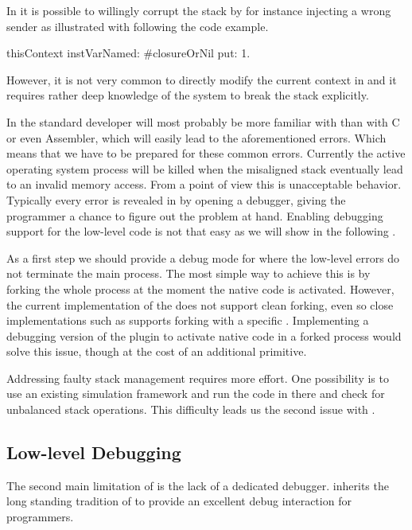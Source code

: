 \noindent In \PH it is possible to willingly corrupt the stack by for instance injecting a wrong sender as illustrated with following the code example.
%
\begin{stcode}[label=lst:benzo-pharo-stack-corruption]{}
thisContext instVarNamed: #closureOrNil put: 1.
\end{stcode}
%
However, it is not very common to directly modify the current context in \PH and it requires rather deep knowledge of the system to break the stack explicitly.

In \B the standard developer will most probably be more familiar with \PH than with C or even Assembler, which will easily lead to the aforementioned errors.
Which means that we have to be prepared for these common errors.
Currently the active operating system process will be killed when the misaligned stack eventually lead to an invalid memory access.
From a \PH point of view this is unacceptable behavior.
Typically every error is revealed in \PH by opening a debugger, giving the programmer a chance to figure out the problem at hand.
Enabling debugging support for the low-level \B code is not that easy as we will show in the following .

As a first step we should provide a debug mode for \B where the low-level errors do not terminate the main process.
The most simple way to achieve this is by forking the whole \VM process at the moment the native \B code is activated.
However, the current implementation of the \PH \VM does not support clean forking, even so close implementations such as \Squeak supports forking with a specific .
Implementing a debugging version of the \B plugin to activate native code in a forked process would solve this issue, though at the cost of an additional primitive.

Addressing faulty stack management requires more effort.
One possibility is to use an existing \ASM simulation framework and run the code in there and check for unbalanced stack operations.
This difficulty leads us the second issue with \B.

\subsection{Low-level Debugging}
The second main limitation of \B is the lack of a dedicated debugger.
\PH inherits the long standing tradition of \ST to provide an excellent debug interaction for programmers.

